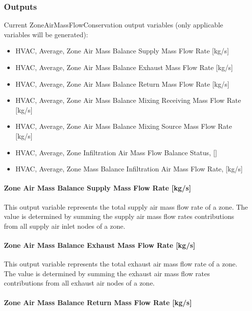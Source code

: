 \subsubsection{Outputs}\label{outputs-7-000}

Current ZoneAirMassFlowConservation output variables (only applicable variables will be generated):

\begin{itemize}
\item
  HVAC, Average, Zone Air Mass Balance Supply Mass Flow Rate {[}kg/s{]}
\item
  HVAC, Average, Zone Air Mass Balance Exhaust Mass Flow Rate {[}kg/s{]}
\item
  HVAC, Average, Zone Air Mass Balance Return Mass Flow Rate {[}kg/s{]}
\item
  HVAC, Average, Zone Air Mass Balance Mixing Receiving Mass Flow Rate {[}kg/s{]}
\item
  HVAC, Average, Zone Air Mass Balance Mixing Source Mass Flow Rate {[}kg/s{]}
\item
  HVAC, Average, Zone Infiltration Air Mass Flow Balance Status, {[]}
\item
  HVAC, Average, Zone Mass Balance Infiltration Air Mass Flow Rate, {[}kg/s{]}
\end{itemize}

\paragraph{Zone Air Mass Balance Supply Mass Flow Rate {[}kg/s{]}}\label{zone-air-mass-balance-supply-mass-flow-rate-kgs}

This output variable represents the total supply air mass flow rate of a zone. The value is determined by summing the supply air mass flow rates contributions from all supply air inlet nodes of a zone.

\paragraph{Zone Air Mass Balance Exhaust Mass Flow Rate {[}kg/s{]}}\label{zone-air-mass-balance-exhaust-mass-flow-rate-kgs}

This output variable represents the total exhaust air mass flow rate of a zone. The value is determined by summing the exhaust air mass flow rates contributions from all exhaust air nodes of a zone.

\paragraph{Zone Air Mass Balance Return Mass Flow Rate {[}kg/s{]}}\label{zone-air-mass-balance-return-mass-flow-rate-kgs}

